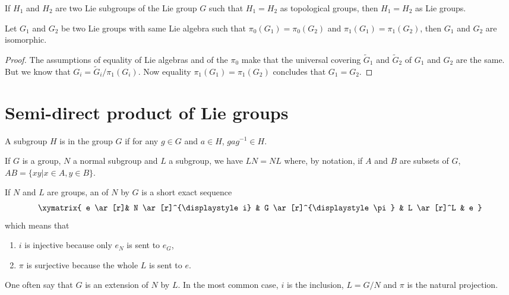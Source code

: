 \begin{corollary} \label{cor:top_subgroup}
    If $H_1$ and $H_2$ are two Lie subgroups of the Lie group $G$  such that $H_1=H_2$ as topological groups, then $H_1=H_2$ as Lie groups.
\end{corollary}

\begin{proposition}
    Let $G_1$ and $G_2$ be two Lie groups with same Lie algebra such that $\pi_0(G_1)=\pi_0(G_2)$ and $\pi_1(G_1)=\pi_1(G_2)$, then $G_1$ and $G_2$ are isomorphic.
\end{proposition}

\begin{proof}
The assumptions of equality of Lie algebras and of the $\pi_0$ make that the universal covering $\tilde G_1$ and $\tilde G_2$ of $G_1$ and $G_2$ are the same. But we know that $G_i=\tilde G_i/\pi_1(G_i)$. Now equality $\pi_1(G_1)=\pi_1(G_2)$ concludes that $G_1=G_2$.
\end{proof}

\section{Semi-direct product of Lie groups}

\begin{definition}
A subgroup $H$ is  in the group $G$ if for any $g\in G$ and $a\in H$, $gag^{-1}\in H$.
\end{definition}

If $G$ is a group, $N$ a normal subgroup and $L$ a subgroup, we have $LN=NL$ where, by notation, if $A$ and $B$ are subsets of $G$, $AB=\{xy|x\in A,y\in B\}$.

If $N$ and $L$ are groups, an  of $N$ by $G$ is a short exact sequence
\begin{equation}
\xymatrix{ e \ar[r]& N \ar[r]^{\displaystyle i} & G \ar[r]^{\displaystyle \pi} & L \ar[r]^L  & e }
\end{equation}
which means that

\begin{enumerate}
\item $i$ is injective because only $e_N$ is sent to $e_G$,
\item $\pi$ is surjective because the whole $L$ is sent to $e$.
\end{enumerate}
One often say that $G$ is an extension of $N$ by $L$. In the most common case, $i$ is the inclusion, $L=G/N$ and $\pi$ is the natural projection.

